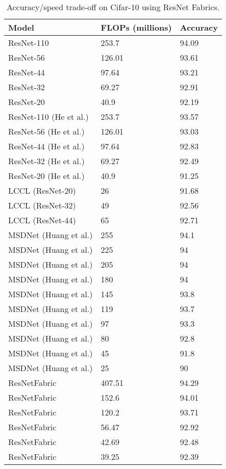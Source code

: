 \begin{table}[]
\centering
\caption{Accuracy/speed trade-off on Cifar-10 using ResNet Fabrics.}
\label{cif10_rnf_flop}
\begin{tabular}{|lll|}
\hline
Model                  & FLOPs (millions) & Accuracy \\ \hline
ResNet-110             & 253.7            & 94.09    \\
ResNet-56              & 126.01           & 93.61    \\
ResNet-44              & 97.64            & 93.21    \\
ResNet-32              & 69.27            & 92.91    \\
ResNet-20              & 40.9             & 92.19    \\ \hline
ResNet-110 (He et al.) & 253.7            & 93.57    \\
ResNet-56  (He et al.) & 126.01           & 93.03    \\
ResNet-44  (He et al.) & 97.64            & 92.83    \\
ResNet-32 (He et al.)  & 69.27            & 92.49    \\
ResNet-20 (He et al.)  & 40.9             & 91.25    \\ \hline
LCCL (ResNet-20)       & 26               & 91.68    \\
LCCL (ResNet-32)       & 49               & 92.56    \\
LCCL (ResNet-44)       & 65               & 92.71    \\ \hline
MSDNet (Huang et al.)  & 255              & 94.1     \\
MSDNet (Huang et al.)  & 225              & 94       \\
MSDNet (Huang et al.)  & 205              & 94       \\
MSDNet (Huang et al.)  & 180              & 94       \\
MSDNet (Huang et al.)  & 145              & 93.8     \\
MSDNet (Huang et al.)  & 119              & 93.7     \\
MSDNet (Huang et al.)  & 97               & 93.3     \\
MSDNet (Huang et al.)  & 80               & 92.8     \\
MSDNet (Huang et al.)  & 45               & 91.8     \\
MSDNet (Huang et al.)  & 25               & 90       \\ \hline
ResNetFabric           & 407.51           & 94.29    \\
ResNetFabric           & 152.6            & 94.01    \\
ResNetFabric           & 120.2            & 93.71    \\
ResNetFabric           & 56.47            & 92.92    \\
ResNetFabric           & 42.69            & 92.48    \\
ResNetFabric           & 39.25            & 92.39    \\ \hline
\end{tabular}
\caption{Accuracy/speed trade-off on Cifar-10 using ResNet Fabrics.}
\label{cif10_rnf_flop}
\end{table}
